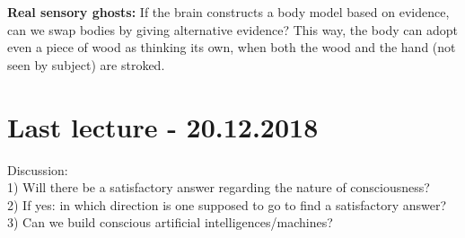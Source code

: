 \documentclass{article}
\begin{document}
	\textbf{Real sensory ghosts:} If the brain constructs a body model based on evidence, can we swap bodies by giving alternative evidence? This way, the body can adopt even a piece of wood as thinking its own, when both the wood and the hand (not seen by subject) are stroked.
	
	\section{Last lecture - 20.12.2018}
	Discussion:\\
	1) Will there be a satisfactory answer regarding the nature of consciousness?\\
	2) If yes: in which direction is one supposed to go to find a satisfactory answer?\\
	3) Can we build conscious artificial intelligences/machines?\\
	
\end{document}

